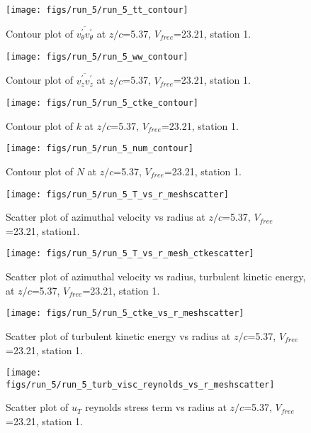 \begin{figure}[H]
\centering
\texttt{[image: figs/run\_5/run\_5\_tt\_contour]}
\caption{Contour plot of $\overline{v_{\theta}^{\prime} v_{\theta}^{\prime}}$ at $z/c$=5.37, $V_{free}$=23.21, station 1.}
\end{figure}


\begin{figure}[H]
\centering
\texttt{[image: figs/run\_5/run\_5\_ww\_contour]}
\caption{Contour plot of $\overline{v_{z}^{\prime} v_{z}^{\prime}}$ at $z/c$=5.37, $V_{free}$=23.21, station 1.}
\end{figure}


\begin{figure}[H]
\centering
\texttt{[image: figs/run\_5/run\_5\_ctke\_contour]}
\caption{Contour plot of $k$ at $z/c$=5.37, $V_{free}$=23.21, station 1.}
\end{figure}


\begin{figure}[H]
\centering
\texttt{[image: figs/run\_5/run\_5\_num\_contour]}
\caption{Contour plot of $N$ at $z/c$=5.37, $V_{free}$=23.21, station 1.}
\end{figure}


\begin{figure}[H]
\centering
\texttt{[image: figs/run\_5/run\_5\_T\_vs\_r\_meshscatter]}
\caption{Scatter plot of azimuthal velocity vs radius at $z/c$=5.37, $V_{free}$=23.21, station1.}
\end{figure}


\begin{figure}[H]
\centering
\texttt{[image: figs/run\_5/run\_5\_T\_vs\_r\_mesh\_ctkescatter]}
\caption{Scatter plot of azimuthal velocity vs radius, turbulent kinetic energy, at $z/c$=5.37, $V_{free}$=23.21, station 1.}
\end{figure}


\begin{figure}[H]
\centering
\texttt{[image: figs/run\_5/run\_5\_ctke\_vs\_r\_meshscatter]}
\caption{Scatter plot of turbulent kinetic energy vs radius at $z/c$=5.37, $V_{free}$=23.21, station 1.}
\end{figure}


\begin{figure}[H]
\centering
\texttt{[image: figs/run\_5/run\_5\_turb\_visc\_reynolds\_vs\_r\_meshscatter]}
\caption{Scatter plot of $
u_T$ reynolds stress term vs radius at $z/c$=5.37, $V_{free}$=23.21, station 1.}
\end{figure}


